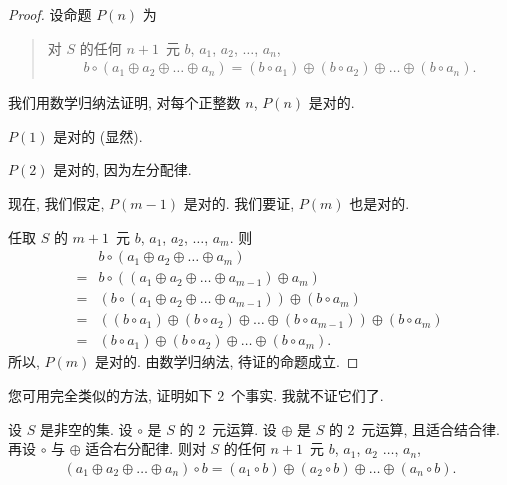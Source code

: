 \documentclass[../libro.tex]{subfiles}
\begin{document}
\begin{proof}
    设命题 \(P(n)\) 为
    \begin{quotation}
        对 \(S\) 的任何 \(n + 1\)~元
        \(b\), \(a_1\), \(a_2\), \(\dots\), \(a_n\),
        \begin{align*}
            b \circ (a_1 \oplus a_2 \oplus \dots \oplus a_n)
            =
            (b \circ a_1) \oplus (b \circ a_2) \oplus
            \dots     \oplus (b \circ a_n).
        \end{align*}
    \end{quotation}
    我们用数学归纳法证明,
    对每个正整数 \(n\), \(P(n)\) 是对的.

    \(P(1)\) 是对的 (显然).

    \(P(2)\) 是对的, 因为左分配律.

    现在, 我们假定, \(P(m-1)\) 是对的.
    我们要证, \(P(m)\) 也是对的.

    任取 \(S\) 的 \(m + 1\)~元
    \(b\), \(a_1\), \(a_2\), \(\dots\), \(a_m\).
    则
    \begin{align*}
        &
        b \circ (a_1 \oplus a_2 \oplus \dots \oplus a_m)
        \\
        = {} &
        b \circ ((a_1 \oplus a_2 \oplus \dots \oplus a_{m-1})
        \oplus a_m)
        \\
        = {} &
        (b \circ (a_1 \oplus a_2 \oplus \dots \oplus a_{m-1}))
        \oplus (b \circ a_m)
        \\
        = {} &
        ((b \circ a_1) \oplus (b \circ a_2) \oplus
        \dots \oplus (b \circ a_{m-1}))
        \oplus (b \circ a_m)
        \\
        = {} &
        (b \circ a_1) \oplus (b \circ a_2) \oplus
        \dots \oplus (b \circ a_m).
    \end{align*}
    所以, \(P(m)\) 是对的.
    由数学归纳法, 待证的命题成立.
\end{proof}

您可用完全类似的方法, 证明如下 \(2\)~个事实.
我就不证它们了.

\begin{theorem}
    设 \(S\) 是非空的集.
    设 \(\circ\) 是 \(S\) 的 \(2\)~元运算.
    设 \(\oplus\) 是 \(S\) 的 \(2\)~元运算,
    且适合结合律.
    再设 \(\circ\) 与 \(\oplus\) 适合右分配律.
    则对 \(S\) 的任何 \(n + 1\)~元
    \(b\), \(a_1\), \(a_2\) \(\dots\), \(a_n\),
    \begin{align*}
        (a_1 \oplus a_2 \oplus \dots \oplus a_n) \circ b
        =
        (a_1 \circ b) \oplus (a_2 \circ b) \oplus
        \dots \oplus (a_n \circ b).
    \end{align*}
\end{theorem}
\end{document}
